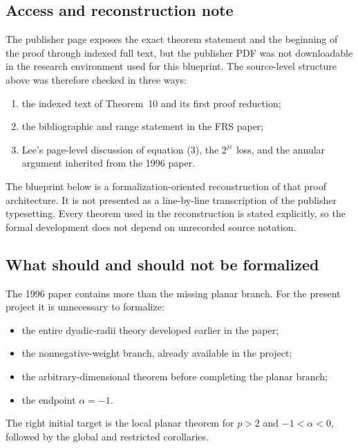 \documentclass[11pt,a4paper]{article}
\theoremstyle{definition}
\theoremstyle{remark}
\begin{document}
\subsection{Access and reconstruction note}

The publisher page exposes the exact theorem statement and the beginning of the
proof through indexed full text, but the publisher PDF was not downloadable in
the research environment used for this blueprint.  The source-level structure
above was therefore checked in three ways:

\begin{enumerate}[leftmargin=8mm]
\item the indexed text of Theorem~10 and its first proof reduction;
\item the bibliographic and range statement in the FRS paper;
\item Lee's page-level discussion of equation (3), the $2^{j\varepsilon}$
      loss, and the annular argument inherited from the 1996 paper.
\end{enumerate}

The blueprint below is a formalization-oriented reconstruction of that proof
architecture.  It is not presented as a line-by-line transcription of the
publisher typesetting.  Every theorem used in the reconstruction is stated
explicitly, so the formal development does not depend on unrecorded source
notation.

\subsection{What should and should not be formalized}

The 1996 paper contains more than the missing planar branch.  For the present
project it is unnecessary to formalize:

\begin{itemize}[leftmargin=7mm]
\item the entire dyadic-radii theory developed earlier in the paper;
\item the nonnegative-weight branch, already available in the project;
\item the arbitrary-dimensional theorem before completing the planar branch;
\item the endpoint $\alpha=-1$.
\end{itemize}

The right initial target is the local planar theorem for $p>2$ and
$-1<\alpha<0$, followed by the global and restricted corollaries.
\end{document}
